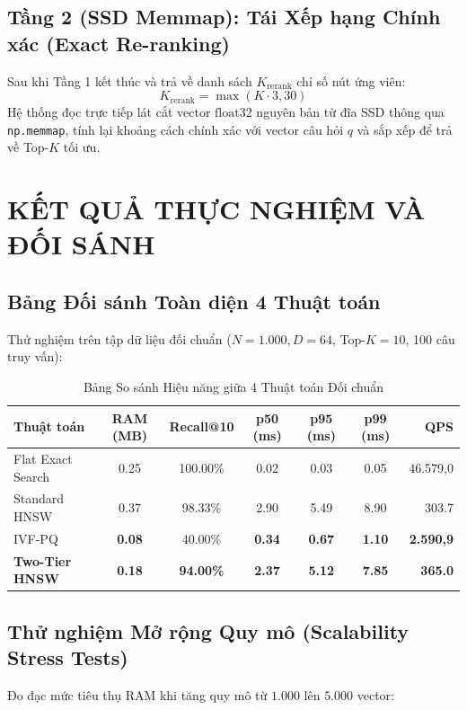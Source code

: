 \documentclass[12pt,a4paper]{article}
\begin{document}
\subsection{Tầng 2 (SSD Memmap): Tái Xếp hạng Chính xác (Exact Re-ranking)}
Sau khi Tầng 1 kết thúc và trả về danh sách $K_{\text{rerank}}$ chỉ số nút ứng viên:
\begin{equation}
K_{\text{rerank}} = \max(K \cdot 3, 30)
\end{equation}
Hệ thống đọc trực tiếp lát cắt vector $\text{float32}$ nguyên bản từ đĩa SSD thông qua \texttt{np.memmap}, tính lại khoảng cách chính xác với vector câu hỏi $q$ và sắp xếp để trả về Top-$K$ tối ưu.

\section{KẾT QUẢ THỰC NGHIỆM VÀ ĐỐI SÁNH}

\subsection{Bảng Đối sánh Toàn diện 4 Thuật toán}
Thử nghiệm trên tập dữ liệu đối chuẩn ($N=1.000, D=64$, Top-$K=10$, 100 câu truy vấn):

\begin{table}[H]
\centering
\small
\caption{Bảng So sánh Hiệu năng giữa 4 Thuật toán Đối chuẩn}
\begin{tabular}{lcccccr}
\toprule
\textbf{Thuật toán} & \textbf{RAM (MB)} & \textbf{Recall@10} & \textbf{p50 (ms)} & \textbf{p95 (ms)} & \textbf{p99 (ms)} & \textbf{QPS} \\
\midrule
Flat Exact Search & 0.25 & 100.00\% & 0.02 & 0.03 & 0.05 & 46.579,0 \\
Standard HNSW & 0.37 & 98.33\% & 2.90 & 5.49 & 8.90 & 303.7 \\
IVF-PQ & \textbf{0.08} & 40.00\% & \textbf{0.34} & \textbf{0.67} & \textbf{1.10} & \textbf{2.590,9} \\
\textbf{Two-Tier HNSW} & \textbf{0.18} & \textbf{94.00\%} & \textbf{2.37} & \textbf{5.12} & \textbf{7.85} & \textbf{365.0} \\
\bottomrule
\end{tabular}
\end{table}

\subsection{Thử nghiệm Mở rộng Quy mô (Scalability Stress Tests)}
Đo đạc mức tiêu thụ RAM khi tăng quy mô từ $1.000$ lên $5.000$ vector:
\end{document}
